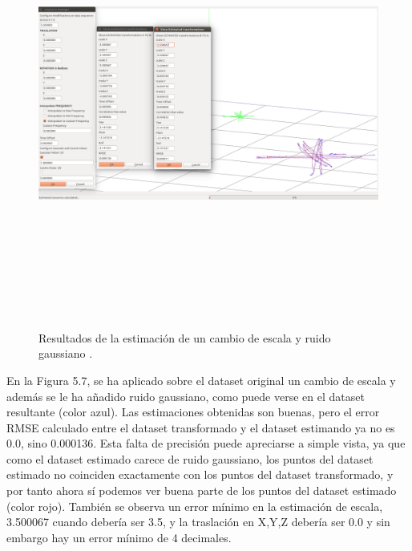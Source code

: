 \begin{figure}[H]
\begin{center}
\label{fig:opciones de View}\includegraphics[height=14.0cm,width=18.0cm]{img/cap6/Escala_GaussNoise_abba.png}
\hspace{0.5cm}

\end{center}

\caption{Resultados de la estimación de un cambio de escala y ruido gaussiano .}
\end{figure}

En la Figura 5.7, se ha aplicado sobre el dataset original un cambio de escala y además se le ha añadido ruido gaussiano, como puede verse en el dataset resultante (color azul). Las estimaciones obtenidas son buenas, pero el error RMSE calculado entre el dataset transformado y el dataset estimando ya no es 0.0, sino 0.000136. Esta falta de precisión puede apreciarse a simple vista, ya que como el dataset estimado carece de ruido gaussiano, los puntos del dataset estimado no coinciden exactamente con los puntos del dataset transformado, y por tanto ahora sí podemos ver buena parte de los puntos del dataset estimado (color rojo).
También se observa un error mínimo en la estimación de escala, 3.500067 cuando debería ser 3.5, y la traslación en X,Y,Z debería ser 0.0 y sin embargo hay un error mínimo de 4 decimales.


